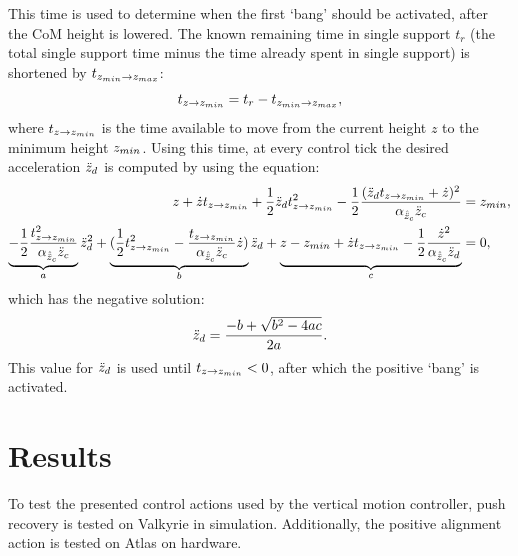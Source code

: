 This time is used to determine when the first `bang' should be activated, after the \ac{CoM} height is lowered. The known remaining time in single support $t_{r}$ (the total single support time minus the time already spent in single support) is shortened by $ t_{z_{min} \rightarrow z_{max}}$:
\begin{equation}
	t_{z \rightarrow z_{min}} =t_{r} - t_{z_{min} \rightarrow z_{max}},
\end{equation}
where $t_{z \rightarrow z_{min}} $ is the time available to move from the current height $z$ to the minimum height $z_{min}$. Using this time, at every control tick the desired acceleration $\ddot{z}_d$ is computed by using the equation:
\begin{align}
	z + \dot{z}t_{z \rightarrow z_{min}} + \frac{1}{2}\ddot{z}_d t_{z \rightarrow z_{min}}^2 - \frac{1}{2}\frac{(\ddot{z}_d t_{z \rightarrow z_{min}} + \dot{z})^2}{\alpha_{\hat{\ddot{z}}_{c}} \ddot{z}_{c}} &= z_{min}, \\
	\underbrace{-\frac{1}{2}\frac{t_{z \rightarrow z_{min}}^2}{\alpha_{\hat{\ddot{z}}_{c}} \ddot{z}_{c}}}_a \ddot{z}_d^2 + \underbrace{(\frac{1}{2}t_{z \rightarrow z_{min}}^2-\frac{t_{z \rightarrow z_{min}}}{\alpha_{\hat{\ddot{z}}_{c}} \ddot{z}_{c}} \dot{z})}_b \ddot{z}_d + \underbrace{z -z_{min} +\dot{z}t_{z \rightarrow z_{min}} -\frac{1}{2}\frac{\dot{z}^2}{\alpha_{\hat{\ddot{z}}_{c}} \ddot{z}_d}}_c&=0,
\end{align}
which has the negative solution:
\begin{equation}
 	\ddot{z}_d = \frac{-b + \sqrt{b^2-4ac}}{2a}.
\end{equation}
This value for $\ddot{z}_d$ is used until $t_{z \rightarrow z_{min}}<0$, after which the positive `bang' is activated. 

\section{Results}
To test the presented control actions used by the vertical motion controller, push recovery is tested on Valkyrie in simulation. Additionally, the positive alignment action is tested on Atlas on hardware.
